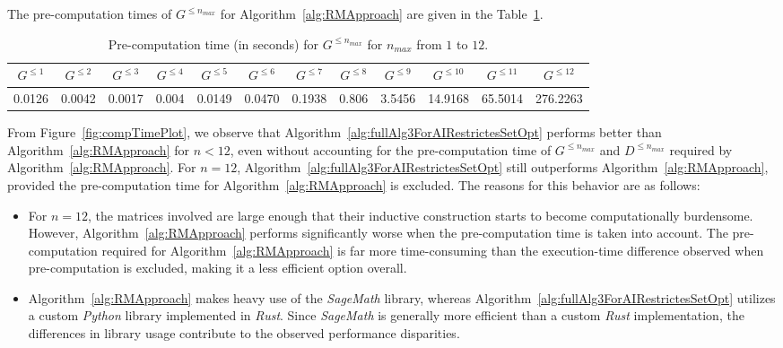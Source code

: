 \documentclass[11pt]{llncs}
\begin{document}
The pre-computation times of $G^{\leq n_{max}}$ for Algorithm~\ref{alg:RMApproach} are given in the Table~\ref{table:preComputationTimes}.
\begin{table}[ht]
\centering
\renewcommand{\tabcolsep}{2pt}	
\begin{tabular}{|c|c|c|c|c|c|c|c|c|c|c|c|}
\hline
    $G^{\leq 1}$  & $G^{\leq 2}$  &$G^{\leq 3}$  & $G^{\leq 4}$  & $G^{\leq 5}$  & $G^{\leq 6}$  & $G^{\leq 7}$  &$G^{\leq 8}$ & $G^{\leq 9}$ & $G^{\leq 10}$ & $G^{\leq 11}$  & $G^{\leq 12}$ \\
 \hline
     0.0126 & 0.0042 & 0.0017 & 0.004 & 0.0149 & 0.0470 & 0.1938 & 0.806& 3.5456& 14.9168& 65.5014 & 276.2263\\
\hline
\end{tabular}
\caption{Pre-computation time (in seconds) for $G^{\leq n_{max}}$ for $n_{max}$ from $1$ to $12$.}\label{table:preComputationTimes}
\end{table}
From Figure~\ref{fig:compTimePlot}, we observe that Algorithm~\ref{alg:fullAlg3ForAIRestrictesSetOpt} performs better than Algorithm~\ref{alg:RMApproach} for $n < 12$, even without accounting for the pre-computation time of $G^{\leq n_{max}}$ and $D^{\leq n_{max}}$ required by Algorithm~\ref{alg:RMApproach}. 
For $n = 12$, Algorithm~\ref{alg:fullAlg3ForAIRestrictesSetOpt} still outperforms Algorithm~\ref{alg:RMApproach}, provided the pre-computation time for Algorithm~\ref{alg:RMApproach} is excluded.  
The reasons for this behavior are as follows:  
\begin{itemize}
    \item For $n = 12$, the matrices involved are large enough that their inductive construction starts to become computationally burdensome. However, Algorithm~\ref{alg:RMApproach} performs significantly worse when the pre-computation time is taken into account. The pre-computation required for Algorithm~\ref{alg:RMApproach} is far more time-consuming than the execution-time difference observed when pre-computation is excluded, making it a less efficient option overall.
    \item Algorithm~\ref{alg:RMApproach} makes heavy use of the \textit{SageMath} library, whereas Algorithm~\ref{alg:fullAlg3ForAIRestrictesSetOpt} utilizes a custom \textit{Python} library implemented in \textit{Rust}. 
    Since \textit{SageMath} is generally more efficient than a custom \textit{Rust} implementation, the differences in library usage contribute to the observed performance disparities.
\end{itemize}
\end{document}
